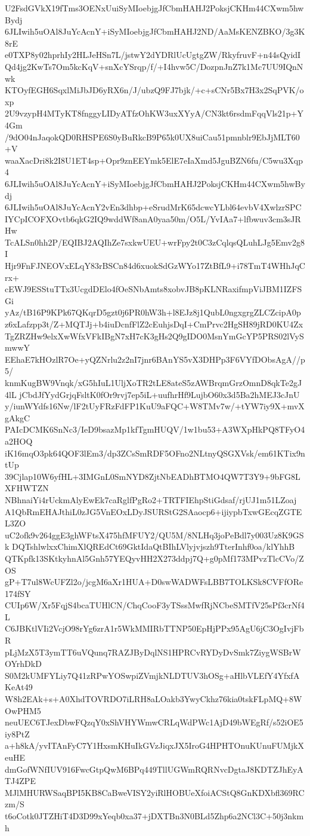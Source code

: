U2FsdGVkX19fTms3OENxUuiSyMIoebjgJfCbmHAHJ2PoksjCKHm44CXwm5hwBydj
6JLIwih5uOAl8JuYcAcnY+iSyMIoebjgJfCbmHAHJ2ND/AaMsKENZBKO/3g3K8rE
e0TXP8y02hprhIy2HLJeHSn7L/jstwY2dYDRlUcUgtgZW/RkyfruvF+n44sQyidI
Qd4jg2KwTs7Om5kcKqV+snXcYSrqp/f/+I4hvw5C/DozpnJnZ7k1Mc7UU9IQnNwk
KTOyfEGH6SqxlMiJbJD6yRX6n/J/ubzQ9FJ7bjk/+c+sCNr5Bx7H3x2SqPVK/oxp
2U9vzypH4MTyKT8fnggyLIDyATfzOhKW3uxXYyA/CN3kt6rsdmFqqVls21p+Y4Gm
/9dO04nJaqokQD0RHSPE6S0yBuRkcB9P65k0UX8uiCau51pmnblr9EbJjMLT60+V
waaXacDri8k2I8U1ET4sp+Opr9znEEYmk5ElE7eIaXmd5JguBZN6fu/C5wu3Xqp4
6JLIwih5uOAl8JuYcAcnY+iSyMIoebjgJfCbmHAHJ2PoksjCKHm44CXwm5hwBydj
6JLIwih5uOAl8JuYcAcnY2vEn3dhbp+eSrudMrK65dcwcYLbl64evbV4XwlzrSPC
IYCpICOFXOvtb6qkG2IQ9wddWf8anA0yaa50m/O5L/YvIAa7+lfbwuv3cm3sJRHw
TcALSn0hh2P/EQIBJ2AQIhZe7sxkwUEU+wrFpy2t0C3zCqlqsQLuhLJg5Emv2g8I
Hjr9FnFJNEOVxELqY83rBSCn84d6xuokSdGzWYo17ZtBfL9+i78TmT4WHhJqCrx+
cEWJ9ESStuTTx3UcgdDElo4fOeSNbAmts8xobvJB8pKLNRaxifmpViJBM1IZFSGi
yAz/tB16P9KPk67QKqrD5gzt0j6PR0hW3h+l8EJz8j1QubL0ngxgrgZLCZcipA0p
z6xLafzpp3t/Z+MQTJj+b4iuDcnfFlZ2cEuhjsDqI+CmPrvc2HgSH89jRD0KU4Zx
TgZRZHw9elxXwWfxVFkIBgN7xH7cK3gHs2Q9gIDO0MsnYmGcYP5PRS02lVySmwwY
EEhaE7kHOzlR7Oe+yQZNrlu2z2nI7jnr6BAnYS5vX3DHPp3F6VYfDObsAgA//p5/
knmKugBW9Vnqk/xG5hIuL1UljXoTR2tLE8ateS5zAWBrqmGrzOmnD8qkTe2gJ4lL
jCbdJfYydGrjqFsltK0fOr9rvj7ep5iL+uufhrHf9LujbO60x3d5Ba2hMEJ3cJnU
y/iunWYdfs16Nw/lF2tUyFRzFdFP1KuU9aFQC+W8TMv7w/+tYW7iy9X+mvXgAkgC
PAIcDCMK6SnNc3/IeD9bsazMp1kfTgmHUQV/1w1bu53+A3WXpHkPQ8TFyO4a2HOQ
iK16mqO3pk64QOF3lEm3/dp3ZCsSmRDF5OFno2NLtnyQSGXVsk/em61KTix9ntUp
39Cjlap10W6yfHL+3IMGnL0SmNYD8ZjtNbEADhBTMO4QW7T3Y9+9bFG8LXFHWTZN
NBhnaiYi4rUckmAlyEwEk7caRglfPgRo2+TRTFIEhpStiGdsaf/rjUJ1m51LZoaj
A1QbRmEHAJthiL0zJG5VnEOxLDyJSURStG2SAaocp6+ijiypbTxwGEcqZGTEL3ZO
uC2ofk9v264ggE3ghWFtsX475hfMFUY2/QU5M/8NLHq3joPeBdl7y003Uz8K9GSk
DQTshlwlxxChimXlQREdCt69GktIdaQtBIhLVlyjvjszh9TterInhf0oa/klYhhB
QTKpfk13SKtkyhnAl5Gnh57YEQyvHH2X273ddpj7Q+g0pMf173MPvzTlcCVo/ZOS
gP+T7ul8WcUFZl2o/jcgM6aXr1HUA+D0swWADWFsLBB7TOLKSk8CVFfORe174fSY
CUIp6W/Xr5FqjS4bcaTUHlCN/ChqCooF3yTSssMwfRjNCbeSMTfV25sPf3crNf4L
C6JBKtlVIi2VcjO98rYg6zrA1r5WkMMIRbTTNP50EpHjPPx95AgU6jC3OgIvjFbR
pLjMzX5T3ymTT6uVQunq7RAZJByDqlNS1HPRCvRYDyDvSmk7ZiygWSBrWOYrhDkD
S0M2kUMFYLiy7Q41zRPwYOSwpiZVmjkNLDTUV3hOSg+aHlbVLEfY4YfxfAKeAt49
W8h2EAk+s+A0XhdTOVRDO7iLRH8aLOakb3YwyCkhz76kia0tskFLpMQ+8WOwPHM5
neuUEC6TJexDbwFQzqY0xShVHYWmwCRLqWdPWc1AjD49bWEgRf/s52iOE5iy8PtZ
a+h8kA/yvITAnFyC7Y1HxsmKHuIkGVzJiqxJX5IroG4HPHTOnuKUnuFUMjkXeuHE
dmGofWNfIUV916FwcGtpQwM6BPq449TllUGWmRQRNvcDgtaJ8KDTZJhEyATJ4ZPE
MJlMHURWSaqBPI5KB8CaBweVISY2yiRlHOBUeXfoiACStQ8GnKDXbfl369RCzm/S
t6oCotk0JTZHiT4D3D99xYeqb0xa37+jDXTBn3N0BLd5Zhp6a2NCl3C+50j3nkmh
